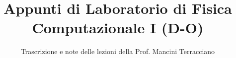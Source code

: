 \documentclass[a4paper,12pt]{article}
\title{Appunti di Laboratorio di Fisica Computazionale I (D-O)}
\author{Trascrizione e note delle lezioni della Prof. Mancini Terracciano}
\date{}
\begin{document}
\maketitle
\projectintro
\tableofcontents
\newpage

\end{document}
